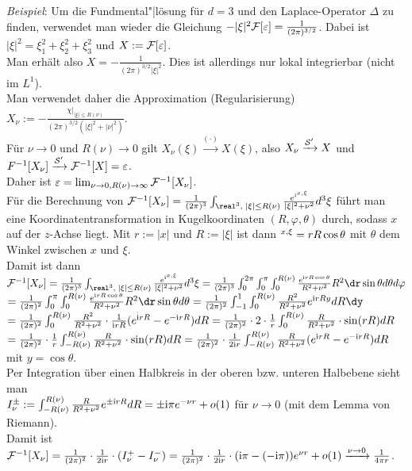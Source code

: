 \emph{Beispiel}:
Um die Fundmental"|lösung für $d = 3$ und den Laplace-Operator $\Delta$
zu finden, verwendet man wieder die Gleichung
$-|\xi|^2 \F[\varepsilon] = \frac{1}{(2\pi)^{3/2}}$.
Dabei ist $|\xi|^2 = \xi_1^2 + \xi_2^2 + \xi_3^2$ und
$X := \F[\varepsilon]$.\\
Man erhält also $X = -\frac{1}{(2\pi)^{3/2} |\xi|^2}$.
Dies ist allerdings nur lokal integrierbar (nicht im $L^1$).\\
Man verwendet daher die Approximation (Regularisierung)
$X_\nu := -\frac{\chi|_{|\xi| \le R(\nu)}}
{(2\pi)^{3/2} (|\xi|^2 + |\nu|^2)}$.\\
Für $\nu \to 0$ und $R(\nu) \to 0$ gilt
$X_\nu(\xi) \xrightarrow{(\cdot)} X(\xi)$,
also $X_\nu \xrightarrow{\S'} X$ und
$F^{-1}[X_\nu] \xrightarrow{\S'} \F^{-1}[X] = \varepsilon$.\\
Daher ist $\varepsilon = \lim_{\nu \to 0, R(\nu) \to \infty} \F^{-1}[X_\nu]$.\\
Für die Berechnung von
$\F^{-1}[X_\nu] = \frac{1}{(2\pi)^3} \int_{\real^3,\; |\xi| \le R(\nu)}
\frac{e^{\i\sp{x, \xi}}}{|\xi|^2 + \nu^2}d^3\xi$ führt man eine
Koordinatentransformation in Kugelkoordinaten $(R, \varphi, \theta)$
durch, sodass $x$ auf der $z$-Achse liegt.
Mit $r := |x|$ und $R := |\xi|$ ist dann $\sp{x, \xi} = rR\cos \theta$
mit $\theta$ dem Winkel zwischen $x$ und $\xi$.\\
Damit ist dann
$\F^{-1}[X_\nu] = \frac{1}{(2\pi)^3} \int_{\real^3,\; |\xi| \le R(\nu)}
\frac{e^{\i\sp{x, \xi}}}{|\xi|^2 + \nu^2}d^3\xi =
\frac{1}{(2\pi)^3} \int_0^{2\pi} \int_0^\pi \int_0^{R(\nu)}
\frac{e^{\i rR\cos \theta}}{R^2 + \nu^2} R^2 \dr \sin \theta d\theta d\varphi$\\
$= \frac{1}{(2\pi)^2} \int_0^\pi \int_0^{R(\nu)}
\frac{e^{\i rR\cos \theta}}{R^2 + \nu^2} R^2 \dr \sin \theta d\theta =
\frac{1}{(2\pi)^2} \int_{-1}^1 \int_0^{R(\nu)} \frac{R^2}{R^2 + \nu^2}
e^{\i rRy} dR\dy$\\
$= \frac{1}{(2\pi)^2} \int_0^{R(\nu)} \frac{R^2}{R^2 + \nu^2} \cdot
\frac{1}{\i rR} (e^{\i rR} - e^{-\i rR}) dR =
\frac{1}{(2\pi)^2} \cdot 2 \cdot \frac{1}{r}
\int_0^{R(\nu)} \frac{R}{R^2 + \nu^2} \cdot \sin(rR) dR$\\
$= \frac{1}{(2\pi)^2} \cdot \frac{1}{r}
\int_{-R(\nu)}^{R(\nu)} \frac{R}{R^2 + \nu^2} \cdot \sin(rR) dR =
\frac{1}{(2\pi)^2} \cdot \frac{1}{2\i r}
\int_{-R(\nu)}^{R(\nu)} \frac{R}{R^2 + \nu^2} (e^{\i rR} - e^{-\i rR}) dR$
mit $y = \cos \theta$.\\
Per Integration über einen Halbkreis in der oberen bzw. unteren Halbebene
sieht man\\
$I_\nu^\pm := \int_{-R(\nu)}^{R(\nu)}
\frac{R}{R^2 + \nu^2} e^{\pm\i rR}dR = \pm\i\pi e^{-\nu r} + o(1)$ für
$\nu \to 0$ (mit dem Lemma von Riemann).\\
Damit ist $\F^{-1}[X_\nu] =
\frac{1}{(2\pi)^2} \cdot \frac{1}{2\i r} \cdot (I_\nu^+ - I_\nu^-) =
\frac{1}{(2\pi)^2} \cdot \frac{1}{2\i r} \cdot (\i\pi - (-\i\pi))e^{\nu r} +
o(1) \xrightarrow{\nu \to 0} \frac{1}{4\pi r}$.

\pagebreak
